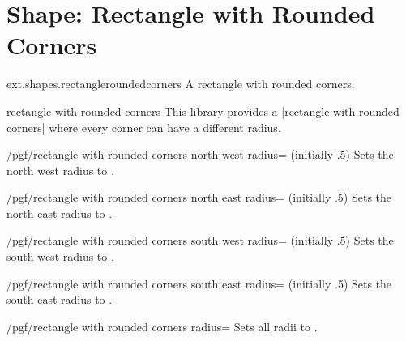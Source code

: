 %
%
%

\section{Shape: Rectangle with Rounded Corners}
\begin{pgflibrary}{ext.shapes.rectangleroundedcorners}
  A rectangle with rounded corners.
\end{pgflibrary}

\begin{shape}{rectangle with rounded corners}
This library provides a |rectangle with rounded corners| where every corner can have a different radius.

\begin{key}{/pgf/rectangle with rounded corners north west radius= (initially .5\string\pgflinewidth)}
  Sets the north west radius to .
\end{key}
\begin{key}{/pgf/rectangle with rounded corners north east radius= (initially .5\string\pgflinewidth)}
  Sets the north east radius to .
\end{key}
\begin{key}{/pgf/rectangle with rounded corners south west radius= (initially .5\string\pgflinewidth)}
  Sets the south west radius to .
\end{key}
\begin{key}{/pgf/rectangle with rounded corners south east radius= (initially .5\string\pgflinewidth)}
  Sets the south east radius to .
\end{key}
\begin{key}{/pgf/rectangle with rounded corners radius=}
  Sets all radii to .
\end{key}


\end{shape}

